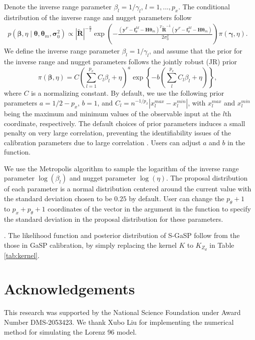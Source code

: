 Denote the inverse range parameter $\beta_l=1/\gamma_l$, $l=1,...,p_x$. The conditional distribution of the inverse range and nugget parameters follow 
\begin{align*}
p(\bm \beta, \eta \mid  \bm \theta, \bm \theta_m, \bm \sigma^{2}_0 )\propto |\mathbf { \tilde R}|^{-\frac{n}{2}} \exp\left( - \frac{(\mathbf y^F-\mathbf f^M_{\theta}- \mathbf H \bm \theta_m )^T \mathbf { \tilde R}^{-1}(\mathbf y^F-\mathbf f^M_{\theta}- \mathbf H \bm \theta_m )  }{2\sigma^2_0}\right)\pi(\bm \gamma, \eta).
\end{align*}
We define the inverse range parameter $\beta_l=1/\gamma_l$, and assume that the prior for the inverse range and nugget parameters follows the jointly robust (JR) prior \citep{gu2019jointly}
\[\pi(\bm \beta, \eta)=C\left( \sum^{p_x}_{l=1} C_l \beta_l+\eta \right)^a \exp\left\{-b \left( \sum^{p_x}_l C_l \beta_l+\eta \right) \right\}, \]
where $C$ is a normalizing constant. By default, we use the following prior parameters $a=1/2-p_x$, $b=1$, and  $C_l= n^{-1/{p_x}}|x^{max}_{l}-x^{min}_{l}| $, with $x^{max}_{l}$ and $x^{min}_{l}$ being the maximum and minimum values of the observable input at the $l$th coordinate, respectively.  %
The default choices of prior parameters induces a small penalty on very large correlation, preventing the identifiability issues of the calibration parameters due to large correlation  \citep{gu2019jointly}. Users can adjust $a$ and $b$ in the  function.

We  use the Metropolis algorithm to sample the logarithm of the inverse range parameter $\log( \beta_l)$ and nugget parameter $\log(\eta)$. 
The proposal distribution of each parameter is a normal distribution  centered around the current value  with the standard deviation chosen to be $0.25$ by default. User can change the $p_{\theta}+1$ to  $p_x+p_{\theta}+1$ coordinates of the vector in the argument   in the  function to specify the standard deviation in the proposal distribution for these parameters.  


. The likelihood function and posterior distribution of  S-GaSP follow from the those in GaSP calibration, by simply replacing the kernel $K$ to $K_{Z_d}$ in Table \ref{tab:kernel}. 




\section*{Acknowledgements}  
This research was supported by the National Science Foundation under Award Number DMS-2053423. We thank Xubo Liu for implementing the numerical method for simulating the Lorenz 96 model.



